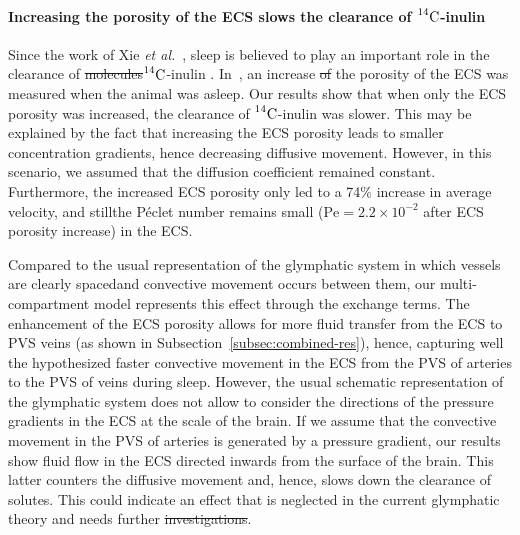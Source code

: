 \documentclass[a4paper,11pt]{article} %
\newcommand{\etal}{\emph{et al.}\;}
\newcommand{\1}{^{(1)}}
\newcommand{\2}{^{(2)}}
\newcommand{\Cinulin}{$\prescript{14}{}{\text{C}}$-inulin }
\providecommand{\DIFaddtex}[1]{{\protect\color{blue}\uwave{#1}}} %
\providecommand{\DIFdeltex}[1]{{\protect\color{red}\sout{#1}}}                      %
\providecommand{\DIFaddbegin}{} %
\providecommand{\DIFaddend}{} %
\providecommand{\DIFdelbegin}{} %
\providecommand{\DIFdelend}{} %
\providecommand{\DIFadd}[1]{\texorpdfstring{\DIFaddtex{#1}}{#1}} %
\providecommand{\DIFdel}[1]{\texorpdfstring{\DIFdeltex{#1}}{}} %
\newcommand{\DIFscaledelfig}{0.5}
\newlength{\DIFdelgraphicswidth} %
\newlength{\DIFdelgraphicsheight} %
\newcommand{\DIFaddincludegraphics}[2][]{{\color{blue}\fbox{\DIFOincludegraphics[#1]{#2}}}} %
\newcommand{\DIFdelincludegraphics}[2][]{%
\sbox{\DIFdelgraphicsbox}{\DIFOincludegraphics[#1]{#2}}%
\settoboxwidth{\DIFdelgraphicswidth}{\DIFdelgraphicsbox} %
\settoboxtotalheight{\DIFdelgraphicsheight}{\DIFdelgraphicsbox} %
\scalebox{\DIFscaledelfig}{%
\parbox[b]{\DIFdelgraphicswidth}{\usebox{\DIFdelgraphicsbox}\\[-\baselineskip] \rule{\DIFdelgraphicswidth}{0em}}\llap{\resizebox{\DIFdelgraphicswidth}{\DIFdelgraphicsheight}{%
\setlength{\unitlength}{\DIFdelgraphicswidth}%
\begin{picture}(1,1)%
\thicklines\linethickness{2pt} %
{\color[rgb]{1,0,0}\put(0,0){\framebox(1,1){}}}%
{\color[rgb]{1,0,0}\put(0,0){\line( 1,1){1}}}%
{\color[rgb]{1,0,0}\put(0,1){\line(1,-1){1}}}%
\end{picture}%
}\hspace*{3pt}}} %
} %
\DeclareRobustCommand{\DIFaddbegin}{\DIFOaddbegin \let\includegraphics\DIFaddincludegraphics} %
\DeclareRobustCommand{\DIFaddend}{\DIFOaddend \let\includegraphics\DIFOincludegraphics} %
\DeclareRobustCommand{\DIFdelbegin}{\DIFOdelbegin \let\includegraphics\DIFdelincludegraphics} %
\DeclareRobustCommand{\DIFdelend}{\DIFOaddend \let\includegraphics\DIFOincludegraphics} %
\begin{document}
\paragraph{Increasing the porosity of the ECS slows the clearance of \Cinulin}

Since the work of Xie \etal~\cite{Xie_2013_sleep}, sleep is believed to play an important role in the clearance of \DIFdelbegin \DIFdel{molecules}\DIFdelend \DIFaddbegin \Cinulin\DIFaddend . In~\cite{Xie_2013_sleep}, an increase \DIFdelbegin \DIFdel{of }\DIFdelend \DIFaddbegin \DIFadd{in }\DIFaddend the porosity of the ECS was measured when the animal was asleep. 
Our results show that when only the ECS porosity was increased, the clearance of \Cinulin was slower. This may be explained by the fact that increasing the ECS porosity leads to smaller concentration gradients, hence decreasing diffusive movement. However, in this scenario, we assumed that the diffusion coefficient remained constant. 
Furthermore, the increased ECS porosity only led to a 74\% increase in average velocity, and still\DIFaddbegin \DIFadd{, }\DIFaddend the P\'eclet number remains small ($\text{Pe} = 2.2 \times 10^{-2}$ after ECS porosity increase) in the ECS.



Compared to the usual representation of the glymphatic system in which vessels are clearly spaced\DIFaddbegin \DIFadd{, }\DIFaddend and convective movement occurs between them, our multi-compartment model represents this effect through the exchange terms. 
The enhancement of the ECS porosity allows for more fluid transfer from the ECS to PVS veins (as shown in Subsection~\ref{subsec:combined-res}), hence, capturing well the hypothesized faster convective movement in the ECS from the PVS of arteries to the PVS of veins during sleep. However, the usual schematic representation of the glymphatic system does not allow \DIFaddbegin \DIFadd{us }\DIFaddend to consider the directions of the pressure gradients in the ECS at the scale of the brain. If we assume that the convective movement in the PVS of arteries is generated by a pressure gradient, our results show fluid flow in the ECS directed inwards from the surface of the brain. This latter counters the diffusive movement and, hence, slows down the clearance of solutes. This could indicate an effect that is neglected in the current glymphatic theory and needs further \DIFdelbegin \DIFdel{investigations}\DIFdelend \DIFaddbegin \DIFadd{investigation}\DIFaddend . 
\end{document}
